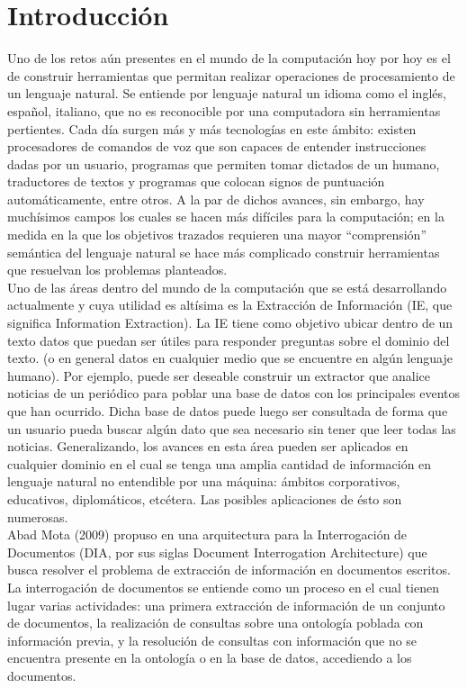 \chapter*{Introducción} \label{chap:intro}

Uno de los retos aún presentes en el mundo de la computación hoy por hoy es el de construir herramientas que permitan realizar operaciones de procesamiento de un lenguaje natural. Se entiende por lenguaje natural un idioma como el inglés, español, italiano, que no es reconocible por una computadora sin herramientas pertientes. Cada día surgen más y más tecnologías en este ámbito: existen procesadores de comandos de voz que son capaces de entender instrucciones dadas por un usuario, programas que permiten tomar dictados de un humano, traductores de textos y programas que colocan signos de puntuación automáticamente, entre otros. A la par de dichos avances, sin embargo, hay muchísimos campos los cuales se hacen más difíciles para la computación; en la medida en la que los objetivos trazados requieren una mayor ``comprensión'' semántica del lenguaje natural se hace más complicado construir herramientas que resuelvan los problemas planteados. \\ 

Uno de las áreas dentro del mundo de la computación que se está desarrollando actualmente y cuya utilidad es altísima es la Extracción de Información (IE, que significa Information Extraction). La IE tiene como objetivo ubicar dentro de un texto datos que puedan ser útiles para responder preguntas sobre el dominio del texto. (o en general datos en cualquier medio que se encuentre en algún lenguaje humano). Por ejemplo, puede ser deseable construir un extractor que analice noticias de un periódico para poblar una base de datos con los principales eventos que han ocurrido. Dicha base de datos puede luego ser consultada de forma que un usuario pueda buscar algún dato que sea necesario sin tener que leer todas las noticias. Generalizando, los avances en esta  área pueden ser aplicados en cualquier dominio en el cual se tenga una amplia cantidad de información en lenguaje natural no entendible por una máquina: ámbitos corporativos, educativos, diplomáticos, etcétera. Las posibles aplicaciones de ésto son numerosas.\\

Abad Mota (2009) propuso en \cite{documentInterrogationArchitecture} una arquitectura para la Interrogación de Documentos (DIA, por sus siglas Document Interrogation Architecture) que busca resolver el problema de extracción de información en documentos escritos. La interrogación de documentos se entiende como un proceso en el cual tienen lugar varias actividades: una primera extracción de información de un conjunto de documentos, la realización de consultas sobre una ontología poblada con información previa, y la resolución de consultas con información que no se encuentra presente en la ontología o en la base de datos, accediendo a los documentos. \\

